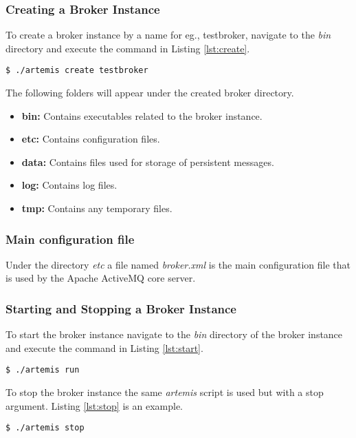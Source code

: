 \subsubsection{Creating a Broker Instance}

To create a broker instance by a name for eg., testbroker, navigate to the \textit{bin} directory and execute the command in Listing \ref{lst:create}. 

\bigskip
\begin{lstlisting}[style=BashInputStyle,caption=Creating broker instance, label={lst:create}]
  $ ./artemis create testbroker
\end{lstlisting}

The following folders will appear under the created broker directory.

\begin{itemize}
    \item \textbf{bin:}
        Contains executables related to the broker instance.

    \item \textbf{etc:}
        Contains configuration files.

    \item \textbf{data:}
        Contains files used for storage of persistent messages.

    \item \textbf{log:}
        Contains log files.

    \item \textbf{tmp:}
        Contains any temporary files.
         
\end{itemize}

\subsubsection{Main configuration file}

Under the directory \textit{etc} a file named \textit{broker.xml} is the main configuration file that is used by the Apache ActiveMQ core server. 

\subsubsection{Starting and Stopping a Broker Instance}

To start the broker instance navigate to the \textit{bin} directory of the broker instance and execute the command in Listing \ref{lst:start}.

\bigskip
\begin{lstlisting}[style=BashInputStyle,caption=Starting broker instance, label={lst:start}]
  $ ./artemis run
\end{lstlisting}

To stop the broker instance the same \textit{artemis} script is used but with a stop argument. Listing \ref{lst:stop} is an example.

\bigskip
\begin{lstlisting}[style=BashInputStyle,caption=Stopping broker instance, label={lst:stop}]
  $ ./artemis stop
\end{lstlisting}
